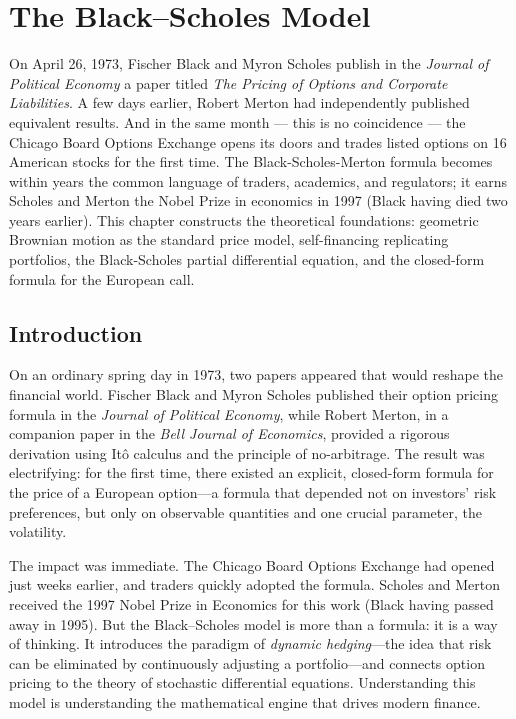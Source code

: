 \chapter{The Black--Scholes Model}
\label{ch:black_scholes}

On April 26, 1973, Fischer Black and Myron Scholes publish in the \emph{Journal of Political Economy} a paper titled \emph{The Pricing of Options and Corporate Liabilities}. A few days earlier, Robert Merton had independently published equivalent results. And in the same month --- this is no coincidence --- the Chicago Board Options Exchange opens its doors and trades listed options on 16 American stocks for the first time. The Black-Scholes-Merton formula becomes within years the common language of traders, academics, and regulators; it earns Scholes and Merton the Nobel Prize in economics in 1997 (Black having died two years earlier). This chapter constructs the theoretical foundations: geometric Brownian motion as the standard price model, self-financing replicating portfolios, the Black-Scholes partial differential equation, and the closed-form formula for the European call.

\section{Introduction}

On an ordinary spring day in 1973, two papers appeared that would reshape the financial world. Fischer Black and Myron Scholes published their option pricing formula in the \emph{Journal of Political Economy}, while Robert Merton, in a companion paper in the \emph{Bell Journal of Economics}, provided a rigorous derivation using It\^o calculus and the principle of no-arbitrage. The result was electrifying: for the first time, there existed an explicit, closed-form formula for the price of a European option---a formula that depended not on investors' risk preferences, but only on observable quantities and one crucial parameter, the volatility.

The impact was immediate. The Chicago Board Options Exchange had opened just weeks earlier, and traders quickly adopted the formula. Scholes and Merton received the 1997 Nobel Prize in Economics for this work (Black having passed away in 1995). But the Black--Scholes model is more than a formula: it is a way of thinking. It introduces the paradigm of \emph{dynamic hedging}---the idea that risk can be eliminated by continuously adjusting a portfolio---and connects option pricing to the theory of stochastic differential equations. Understanding this model is understanding the mathematical engine that drives modern finance.

